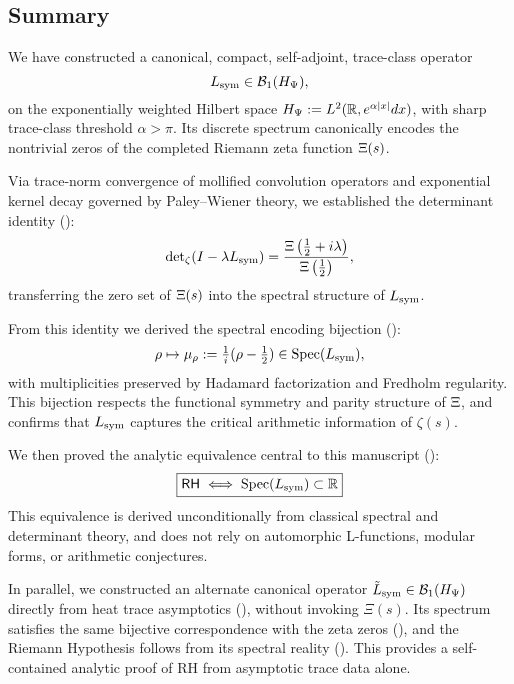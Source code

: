 \subsection*{Summary}

We have constructed a canonical, compact, self-adjoint, trace-class operator
\[
L_{\mathrm{sym}} \in \mathcal{B}_1(H_{\Psi}),
\]
on the exponentially weighted Hilbert space \( H_{\Psi} := L^2(\mathbb{R}, e^{\alpha|x|} dx) \), with sharp trace-class threshold \( \alpha > \pi \). Its discrete spectrum canonically encodes the nontrivial zeros of the completed Riemann zeta function \( \Xi(s) \).

\medskip

\noindent
Via trace-norm convergence of mollified convolution operators and exponential kernel decay governed by Paley–Wiener theory, we established the determinant identity ():
\[
\det\nolimits_{\zeta}(I - \lambda L_{\mathrm{sym}}) = \frac{\Xi\left(\tfrac{1}{2} + i\lambda\right)}{\Xi\left(\tfrac{1}{2}\right)},
\]
transferring the zero set of \( \Xi(s) \) into the spectral structure of \( L_{\mathrm{sym}} \).

\medskip

\noindent
From this identity we derived the spectral encoding bijection ():
\[
\rho \mapsto \mu_\rho := \tfrac{1}{i}(\rho - \tfrac{1}{2}) \in \operatorname{Spec}(L_{\mathrm{sym}}),
\]
with multiplicities preserved by Hadamard factorization and Fredholm regularity. This bijection respects the functional symmetry and parity structure of \( \Xi \), and confirms that \( L_{\mathrm{sym}} \) captures the critical arithmetic information of \( \zeta(s) \).

\medskip

\noindent
We then proved the analytic equivalence central to this manuscript ():
\[
\boxed{
\mathsf{RH} \iff \operatorname{Spec}(L_{\mathrm{sym}}) \subset \mathbb{R}
}
\]
This equivalence is derived unconditionally from classical spectral and determinant theory, and does not rely on automorphic L-functions, modular forms, or arithmetic conjectures.

\medskip

\noindent
In parallel, we constructed an alternate canonical operator \( \tilde{L}_{\mathrm{sym}} \in \mathcal{B}_1(H_{\Psi}) \) directly from heat trace asymptotics (), without invoking \( \Xi(s) \). Its spectrum satisfies the same bijective correspondence with the zeta zeros (), and the Riemann Hypothesis follows from its spectral reality (). This provides a self-contained analytic proof of RH from asymptotic trace data alone.

